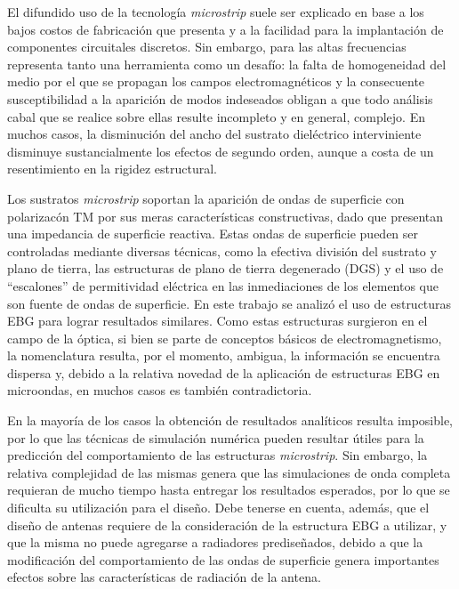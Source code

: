 

El difundido uso de la tecnología \textit{microstrip} suele ser explicado en base a los bajos costos de fabricación que presenta y a la facilidad para la implantación de componentes circuitales discretos. Sin embargo, para las altas frecuencias representa tanto una herramienta como un desafío: la falta de homogeneidad del medio por el que se propagan los campos electromagnéticos y la consecuente susceptibilidad a la aparición de modos indeseados obligan a que todo análisis cabal que se realice sobre ellas resulte incompleto y en general, complejo. En muchos casos, la disminución del ancho del sustrato dieléctrico interviniente disminuye sustancialmente los efectos de segundo orden, aunque a costa de un resentimiento en la rigidez estructural.

Los sustratos \textit{microstrip} soportan la aparición de ondas de superficie con polarizacón TM por sus meras características constructivas, dado que presentan una impedancia de superficie reactiva. Estas ondas de superficie pueden ser controladas mediante diversas técnicas, como la efectiva división del sustrato y plano de tierra, las estructuras de plano de tierra degenerado (DGS) y el uso de \enquote{escalones} de permitividad eléctrica en las inmediaciones de los elementos que son fuente de ondas de superficie. En este trabajo se analizó el uso de estructuras EBG para lograr resultados similares. Como estas estructuras surgieron en el campo de la óptica, si bien se parte de conceptos básicos de electromagnetismo, la nomenclatura resulta, por el momento, ambigua, la información se encuentra dispersa y, debido a la relativa novedad de la aplicación de estructuras EBG en microondas, en muchos casos es también contradictoria.

En la mayoría de los casos la obtención de resultados analíticos resulta imposible, por lo que las técnicas de simulación numérica pueden resultar útiles para la predicción del comportamiento de las estructuras \textit{microstrip}. Sin embargo, la relativa complejidad de las mismas genera que las simulaciones de onda completa requieran de mucho tiempo hasta entregar los resultados esperados, por lo que se dificulta su utilización para el diseño. Debe tenerse en cuenta, además, que el diseño de antenas requiere de la consideración de la estructura EBG a utilizar, y que la misma no puede agregarse a radiadores prediseñados, debido a que la modificación del comportamiento de las ondas de superficie genera importantes efectos sobre las características de radiación de la antena.

